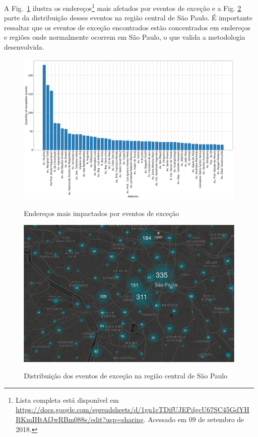 \documentclass[
	12pt,				%
	oneside,			%
	a4paper,			%
	english,			%
	brazil				%
	]{abntex2ppgsi}
\begin{document}
{{A Fig.~\ref{fig:address_analysis} ilustra os endereços\footnote{Lista completa está disponível em \url{https://docs.google.com/spreadsheets/d/1gn1cTDifUJEPdgcU67SC45GdYHRKmIHtAfJwRBm088s/edit?usp=sharing}. Acessado em 09 de setembro de 2018.} mais afetados por eventos de exceção e a Fig. \ref{fig:dispersion} parte da distribuição desses eventos na região central de São Paulo. É importante ressaltar que os eventos de exceção encontrados estão concentrados em endereços e regiões onde normalmente ocorrem em São Paulo, o que valida a metodologia desenvolvida.

\begin{figure}[!htb]
	\centering
 	  \caption{Endereços mais impactados por eventos de exceção}
		\includegraphics[width=1\linewidth]{images/address_analysis.png}
	\label{fig:address_analysis}
\end{figure}

\begin{figure}[!htb]
	\centering
 	  \caption{Distribuição dos eventos de exceção na região central de São Paulo}
		\includegraphics[width=1\linewidth]{images/exception_events_sp.png}
	\label{fig:dispersion}
\end{figure}

}}
\end{document}
